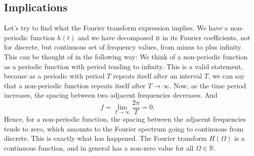 \subsection {Implications} 
Let's try to find what the Fourier transform expression implies. We have a non-periodic function $h(t)$ and we have decomposed it in its Fourier coefficients, not for discrete, but continuous set of frequency values, from minus to plus infinity. This can be thought of in the following way: We think of a non-periodic function as a periodic function with period tending to infinity. This is a valid statement, because as a periodic with period $T$ repeats itself after an interval $T$, we can say that a non-periodic function repeats itself after $T \to \infty$. Now, as the time period increases, the spacing between two adjacent frequencies decreases. And
\[
f = \lim_{T\to\infty}\frac{2\pi}{T} = 0.
\]
Hence, for a non-periodic function, the spacing between the adjacent frequencies tends to zero, which amounts to the Fourier spectrum going to continuous from discrete. This is exactly what has happened. The Fourier transform $H(\Omega)$ is a continuous function, and in general has a non-zero value for all $\Omega \in \mathbb{R}$.





